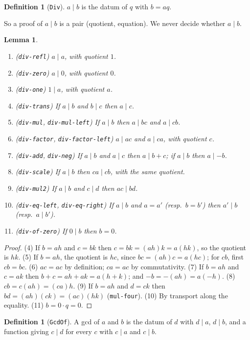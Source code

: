 \documentclass[11pt]{amsart}
\newtheorem{lemma}[theorem]{Lemma}
\theoremstyle{definition}
\newtheorem{definition}[theorem]{Definition}
\theoremstyle{remark}
\newcommand{\nm}[1]{\textup{\texttt{#1}}}
\begin{document}
\begin{definition}[\nm{Div}]
$a\mid b$ is the datum of $q$ with $b = aq$.
\end{definition}

\noindent So a proof of $a\mid b$ is a pair (quotient, equation). We never
decide whether $a\mid b$.

\begin{lemma}\label{lem:div}
\begin{enumerate}
\item (\nm{div-refl}) $a\mid a$, with quotient $1$.
\item (\nm{div-zero}) $a\mid 0$, with quotient $0$.
\item (\nm{div-one}) $1\mid a$, with quotient $a$.
\item (\nm{div-trans}) If $a\mid b$ and $b\mid c$ then $a\mid c$.
\item (\nm{div-mul}, \nm{div-mul-left}) If $a\mid b$ then $a\mid bc$ and
  $a\mid cb$.
\item (\nm{div-factor}, \nm{div-factor-left}) $a\mid ac$ and $a\mid ca$,
  with quotient $c$.
\item (\nm{div-add}, \nm{div-neg}) If $a\mid b$ and $a\mid c$ then
  $a\mid b+c$; if $a\mid b$ then $a\mid -b$.
\item (\nm{div-scale}) If $a\mid b$ then $ca\mid cb$, with the same
  quotient.
\item (\nm{div-mul2}) If $a\mid b$ and $c\mid d$ then $ac\mid bd$.
\item (\nm{div-eq-left}, \nm{div-eq-right}) If $a\mid b$ and $a=a'$
  (resp.\ $b=b'$) then $a'\mid b$ (resp.\ $a\mid b'$).
\item (\nm{div-of-zero}) If $0\mid b$ then $b=0$.
\end{enumerate}
\end{lemma}
\begin{proof}
(4) If $b = ah$ and $c = bk$ then
$c = bk = (ah)k = a(hk)$, so the quotient is $hk$.
(5) If $b=ah$, the quotient is $hc$, since $bc = (ah)c = a(hc)$; for $cb$,
first $cb=bc$.
(6) $ac = ac$ by definition; $ca = ac$ by commutativity.
(7) If $b=ah$ and $c=ak$ then $b+c = ah+ak = a(h+k)$; and
$-b = -(ah) = a(-h)$.
(8) $cb = c(ah) = (ca)h$.
(9) If $b=ah$ and $d=ck$ then $bd = (ah)(ck) = (ac)(hk)$
(\nm{mul-four}).
(10) By transport along the equality.
(11) $b = 0\cdot q = 0$.
\end{proof}

\begin{definition}[\nm{GcdOf}]
A gcd of $a$ and $b$ is the datum of $d$ with $d\mid a$, $d\mid b$, and a
function giving $c\mid d$ for every $c$ with $c\mid a$ and $c\mid b$.
\end{definition}
\end{document}
